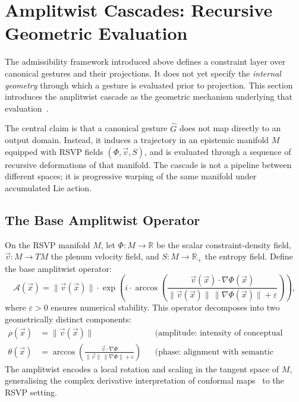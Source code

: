 \documentclass[11pt, a4paper]{article}
\begin{document}
\section{Amplitwist Cascades: Recursive Geometric Evaluation}

The admissibility framework introduced above defines a constraint layer
over canonical gestures and their projections. It does not yet specify
the \emph{internal geometry} through which a gesture is evaluated prior
to projection. This section introduces the amplitwist cascade as the
geometric mechanism underlying that evaluation~\cite{needham1997}.

The central claim is that a canonical gesture $\hat{G}$ does not map
directly to an output domain. Instead, it induces a trajectory in an
epistemic manifold $M$ equipped with RSVP fields $(\Phi, \vec{v}, S)$,
and is evaluated through a sequence of recursive deformations of that
manifold. The cascade is not a pipeline between different spaces; it is
progressive warping of the same manifold under accumulated Lie action.

\subsection{The Base Amplitwist Operator}

On the RSVP manifold $M$, let $\Phi : M \to \mathbb{R}$ be the scalar
constraint-density field, $\vec{v} : M \to TM$ the plenum velocity
field, and $S : M \to \mathbb{R}_+$ the entropy field. Define the base
amplitwist operator:
\[
  \mathcal{A}(\vec{x}) =
  \|\vec{v}(\vec{x})\| \cdot
  \exp\!\left(
    i \cdot \arccos\!\left(
      \frac{\vec{v}(\vec{x}) \cdot \nabla\Phi(\vec{x})}
           {\|\vec{v}(\vec{x})\|\,\|\nabla\Phi(\vec{x})\| + \varepsilon}
    \right)
  \right),
\]
where $\varepsilon > 0$ ensures numerical stability. This operator
decomposes into two geometrically distinct components:
\begin{align*}
  \rho(\vec{x}) &= \|\vec{v}(\vec{x})\| && \text{(amplitude: intensity of conceptual flow)}\\
  \theta(\vec{x}) &= \arccos\!\left(
    \frac{\vec{v}\cdot\nabla\Phi}{\|\vec{v}\|\,\|\nabla\Phi\|+\varepsilon}
  \right) && \text{(phase: alignment with semantic gradient)}
\end{align*}
The amplitwist encodes a local rotation and scaling in the tangent space
of $M$, generalising the complex derivative interpretation of conformal
maps~\cite{needham1997} to the RSVP setting.
\end{document}
